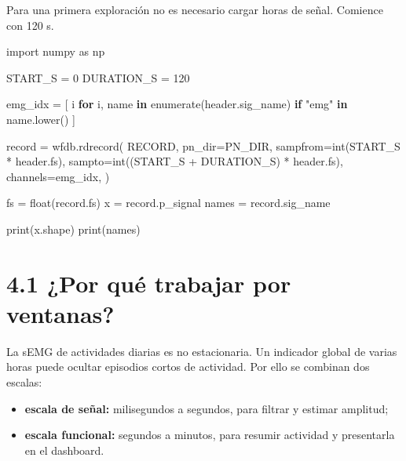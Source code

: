 \documentclass[
  spanish,
  a4paper,
  DIV=11,
  numbers=noendperiod]{scrreprt}
\newenvironment{Shaded}{\begin{snugshade}}{\end{snugshade}}
\newcommand{\BuiltInTok}[1]{\textcolor[rgb]{0.00,0.23,0.31}{#1}}
\newcommand{\ControlFlowTok}[1]{\textcolor[rgb]{0.00,0.23,0.31}{\textbf{#1}}}
\newcommand{\DecValTok}[1]{\textcolor[rgb]{0.68,0.00,0.00}{#1}}
\newcommand{\ImportTok}[1]{\textcolor[rgb]{0.00,0.46,0.62}{#1}}
\newcommand{\KeywordTok}[1]{\textcolor[rgb]{0.00,0.23,0.31}{\textbf{#1}}}
\newcommand{\NormalTok}[1]{\textcolor[rgb]{0.00,0.23,0.31}{#1}}
\newcommand{\OperatorTok}[1]{\textcolor[rgb]{0.37,0.37,0.37}{#1}}
\newcommand{\StringTok}[1]{\textcolor[rgb]{0.13,0.47,0.30}{#1}}
\providecommand{\tightlist}{%
  \setlength{\itemsep}{0pt}\setlength{\parskip}{0pt}}
\begin{document}
Para una primera exploración no es necesario cargar horas de señal.
Comience con 120 s.

\begin{Shaded}
\begin{Highlighting}[]
\ImportTok{import}\NormalTok{ numpy }\ImportTok{as}\NormalTok{ np}

\NormalTok{START\_S }\OperatorTok{=} \DecValTok{0}
\NormalTok{DURATION\_S }\OperatorTok{=} \DecValTok{120}

\NormalTok{emg\_idx }\OperatorTok{=}\NormalTok{ [}
\NormalTok{    i }\ControlFlowTok{for}\NormalTok{ i, name }\KeywordTok{in} \BuiltInTok{enumerate}\NormalTok{(header.sig\_name)}
    \ControlFlowTok{if} \StringTok{"emg"} \KeywordTok{in}\NormalTok{ name.lower()}
\NormalTok{]}

\NormalTok{record }\OperatorTok{=}\NormalTok{ wfdb.rdrecord(}
\NormalTok{    RECORD,}
\NormalTok{    pn\_dir}\OperatorTok{=}\NormalTok{PN\_DIR,}
\NormalTok{    sampfrom}\OperatorTok{=}\BuiltInTok{int}\NormalTok{(START\_S }\OperatorTok{*}\NormalTok{ header.fs),}
\NormalTok{    sampto}\OperatorTok{=}\BuiltInTok{int}\NormalTok{((START\_S }\OperatorTok{+}\NormalTok{ DURATION\_S) }\OperatorTok{*}\NormalTok{ header.fs),}
\NormalTok{    channels}\OperatorTok{=}\NormalTok{emg\_idx,}
\NormalTok{)}

\NormalTok{fs }\OperatorTok{=} \BuiltInTok{float}\NormalTok{(record.fs)}
\NormalTok{x }\OperatorTok{=}\NormalTok{ record.p\_signal}
\NormalTok{names }\OperatorTok{=}\NormalTok{ record.sig\_name}

\BuiltInTok{print}\NormalTok{(x.shape)}
\BuiltInTok{print}\NormalTok{(names)}
\end{Highlighting}
\end{Shaded}

\section{4.1 ¿Por qué trabajar por
ventanas?}\label{por-quuxe9-trabajar-por-ventanas}

La sEMG de actividades diarias es no estacionaria. Un indicador global
de varias horas puede ocultar episodios cortos de actividad. Por ello se
combinan dos escalas:

\begin{itemize}
\tightlist
\item
  \textbf{escala de señal:} milisegundos a segundos, para filtrar y
  estimar amplitud;
\item
  \textbf{escala funcional:} segundos a minutos, para resumir actividad
  y presentarla en el dashboard.
\end{itemize}
\end{document}
